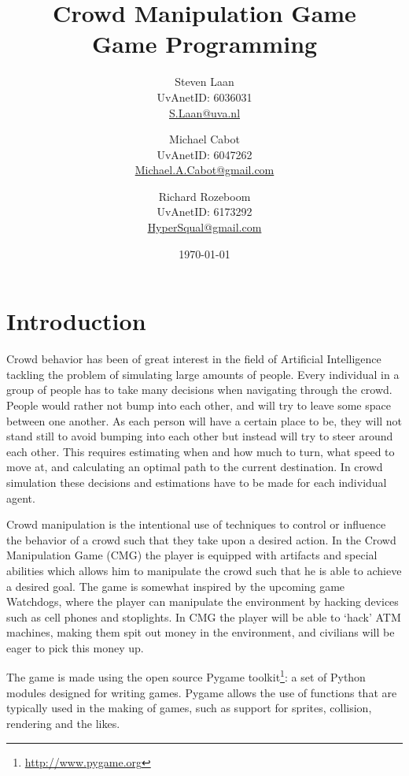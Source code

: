 \documentclass[a4paper,pdf,12pt]{article}
\title{Crowd Manipulation Game\\ \normalsize{Game Programming}}
\author{Steven Laan\\UvAnetID: 6036031\\\url{S.Laan@uva.nl} \and Michael Cabot\\UvAnetID: 6047262\\\url{Michael.A.Cabot@gmail.com} \and Richard Rozeboom\\UvAnetID: 6173292\\\url{HyperSqual@gmail.com}}
\date{\today}
\begin{document}
\maketitle
{}

\section{Introduction}
Crowd behavior has been of great interest in the field of Artificial Intelligence tackling the problem of simulating large amounts of people. Every individual in a group of people has to take  many decisions when navigating through the crowd. People would rather not bump into each other, and will try to leave some space between one another. As each person will have a certain place to be, they will not stand still to avoid bumping into each other but instead will try to steer around each other. This requires estimating when and how much to turn, what speed to move at, and calculating an optimal path to the current destination. In crowd simulation these decisions and estimations have to be made for each individual agent.

Crowd manipulation is the intentional use of techniques to control or influence the behavior of a crowd such that they take upon a desired action. In the Crowd Manipulation Game (CMG) the player is equipped with artifacts and special abilities which allows him to manipulate the crowd such that he is able to achieve a desired goal. The game is somewhat inspired by the upcoming game Watchdogs\citep{watchdogs}, where the player can manipulate the environment by hacking devices such as cell phones and stoplights. In CMG the player will be able to `hack' ATM machines, making them spit out money in the environment, and civilians will be eager to pick this money up.

The game is made using the open source Pygame toolkit\footnote{\url{http://www.pygame.org}}: a set of Python modules designed for writing games. Pygame allows the use of functions that are typically used in the making of games, such as support for sprites, collision, rendering and the likes. 
\end{document}
